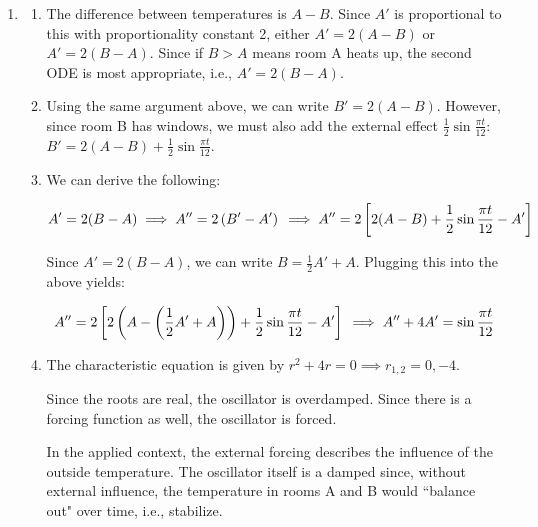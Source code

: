\begin{enumerate}
    \item 
    \begin{enumerate}
        \item The difference between temperatures is $A - B$. Since $A'$ is proportional to this with proportionality constant 2, either $A' = 2(A- B)$ or $A' = 2(B-A)$. Since if $B > A$ means room A heats up, the second ODE is most appropriate, i.e., $A' = 2(B-A)$.

        \item Using the same argument above, we can write $B' = 2(A - B)$. However, since room B has windows, we must also add the external effect $\frac{1}{2}\sin{\frac{\pi t}{12}}$: $B' = 2(A-B) + \frac{1}{2}\sin{\frac{\pi t}{12}}$.

        \item We can derive the following:
	
    	\[
    	    A' = 2(B-A)\\
    	    \implies A'' = 2\left(B'-A'\right)\\
    	    \implies A'' = 2\left[2(A-B) + \frac{1}{2}\sin{\frac{\pi t}{12}} - A'\right]
    	\]
    	
    	Since $A' = 2(B-A)$, we can write $B = \frac{1}{2}A' + A$. Plugging this into the above yields:
    	
    	\[
    	    A'' = 2\left[2\left(A - \left(\frac{1}{2}A' + A\right)\right) + \frac{1}{2}\sin{\frac{\pi t}{12}} - A'\right]\\
    	    \implies A'' + 4A' = \sin{\frac{\pi t}{12}}
    	\]

        \item The characteristic equation is given by $r^2 + 4r = 0 \implies r_{1,2} = 0, -4$. 
	    
	    Since the roots are real, the oscillator is overdamped. Since there is a forcing function as well, the oscillator is forced. 
	    
	    In the applied context, the external forcing describes the influence of the outside temperature. The oscillator itself is a damped since, without external influence, the temperature in rooms A and B would ``balance out" over time, i.e., stabilize.
    \end{enumerate}
\end{enumerate}